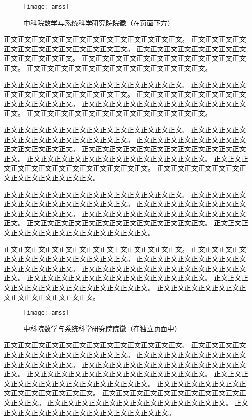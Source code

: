 \begin{figure}[b]
 \centering
 \texttt{[image: amss]}
 \caption{中科院数学与系统科学研究院院徽（在页面下方）}
 \label{fig:amss3}
\end{figure}


正文正文正文正文正文正文正文正文正文正文正文正文正文。
正文正文正文正文正文正文正文正文正文正文正文正文正文。
正文正文正文正文正文正文正文正文正文正文正文正文正文。
正文正文正文正文正文正文正文正文正文正文正文正文正文。
正文正文正文正文正文正文正文正文正文正文正文正文正文。

正文正文正文正文正文正文正文正文正文正文正文正文正文。
正文正文正文正文正文正文正文正文正文正文正文正文正文。
正文正文正文正文正文正文正文正文正文正文正文正文正文。
正文正文正文正文正文正文正文正文正文正文正文正文正文。
正文正文正文正文正文正文正文正文正文正文正文正文正文。

正文正文正文正文正文正文正文正文正文正文正文正文正文。
正文正文正文正文正文正文正文正文正文正文正文正文正文。
正文正文正文正文正文正文正文正文正文正文正文正文正文。
正文正文正文正文正文正文正文正文正文正文正文正文正文。
正文正文正文正文正文正文正文正文正文正文正文正文正文。
正文正文正文正文正文正文正文正文正文正文正文正文正文。
正文正文正文正文正文正文正文正文正文正文正文正文正文。

正文正文正文正文正文正文正文正文正文正文正文正文正文。
正文正文正文正文正文正文正文正文正文正文正文正文正文。
正文正文正文正文正文正文正文正文正文正文正文正文正文。
正文正文正文正文正文正文正文正文正文正文正文正文正文。
正文正文正文正文正文正文正文正文正文正文正文正文正文。
正文正文正文正文正文正文正文正文正文正文正文正文正文。

正文正文正文正文正文正文正文正文正文正文正文正文正文。
正文正文正文正文正文正文正文正文正文正文正文正文正文。
正文正文正文正文正文正文正文正文正文正文正文正文正文。
正文正文正文正文正文正文正文正文正文正文正文正文正文。
正文正文正文正文正文正文正文正文正文正文正文正文正文。
正文正文正文正文正文正文正文正文正文正文正文正文正文。
正文正文正文正文正文正文正文正文正文正文正文正文正文。

\begin{figure}[p]
 \centering
 \texttt{[image: amss]}
 \caption{中科院数学与系统科学研究院院徽（在独立页面中）}
 \label{fig:amss4}
\end{figure}

正文正文正文正文正文正文正文正文正文正文正文正文正文。
正文正文正文正文正文正文正文正文正文正文正文正文正文。
正文正文正文正文正文正文正文正文正文正文正文正文正文。
正文正文正文正文正文正文正文正文正文正文正文正文正文。
正文正文正文正文正文正文正文正文正文正文正文正文正文。
正文正文正文正文正文正文正文正文正文正文正文正文正文。
正文正文正文正文正文正文正文正文正文正文正文正文正文。
正文正文正文正文正文正文正文正文正文正文正文正文正文。
正文正文正文正文正文正文正文正文正文正文正文正文正文。
正文正文正文正文正文正文正文正文正文正文正文正文正文。
